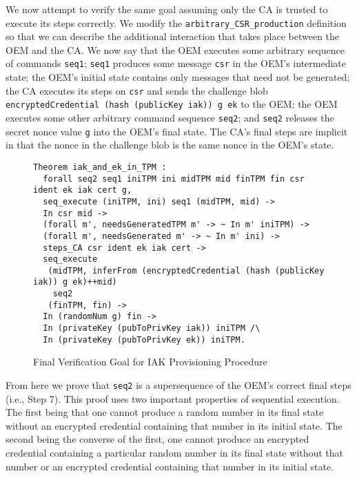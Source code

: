 \documentclass[runningheads]{llncs}
\begin{document}
We now attempt to verify the same goal assuming only the CA is trusted
to execute its steps correctly. 
We modify the \verb|arbitrary_CSR_production| definition 
so that we can describe the additional interaction
that takes place between the OEM and the CA. We now say that
the OEM executes some arbitrary sequence of commands \verb|seq1|;
\verb|seq1| produces some message \verb|csr| in the OEM's intermediate
state; the OEM's initial state contains only messages that need not be
generated; the CA executes its steps on \verb|csr| and sends the
challenge blob \verb|encryptedCredential (hash (publicKey iak)) g ek|
to the OEM; the OEM executes some other arbitrary command sequence \verb|seq2|;
and \verb|seq2| releases the secret nonce value \verb|g| into the OEM's
final state. The CA's final steps are implicit in that the nonce in
the challenge blob is the same nonce in the OEM's state.

\begin{figure}[hptb]
\vspace{-\medskipamount}
\vspace{-\medskipamount}
\begin{lstlisting}[language=Coq]
Theorem iak_and_ek_in_TPM :
  forall seq2 seq1 iniTPM ini midTPM mid finTPM fin csr ident ek iak cert g,
  seq_execute (iniTPM, ini) seq1 (midTPM, mid) -> 
  In csr mid ->
  (forall m', needsGeneratedTPM m' -> ~ In m' iniTPM) ->
  (forall m', needsGenerated m' -> ~ In m' ini) ->
  steps_CA csr ident ek iak cert ->
  seq_execute
   (midTPM, inferFrom (encryptedCredential (hash (publicKey iak)) g ek)++mid)
    seq2 
   (finTPM, fin) ->
  In (randomNum g) fin ->
  In (privateKey (pubToPrivKey iak)) iniTPM /\ 
  In (privateKey (pubToPrivKey ek)) iniTPM.
\end{lstlisting}
\caption{Final Verification Goal for IAK Provisioning Procedure}
\label{fig:iak_goal}
\end{figure}

From here we prove that \verb|seq2| is a supersequence of the OEM's
correct final steps (i.e., Step 7). This proof uses two important
properties of sequential execution. The first being that one cannot
produce a random number in its final state without an encrypted
credential containing that number in its initial state. The second
being the converse of the first, one cannot produce an encrypted
credential containing a particular random number in its final state
without that number or an encrypted credential containing that number
in its initial state.
\end{document}
